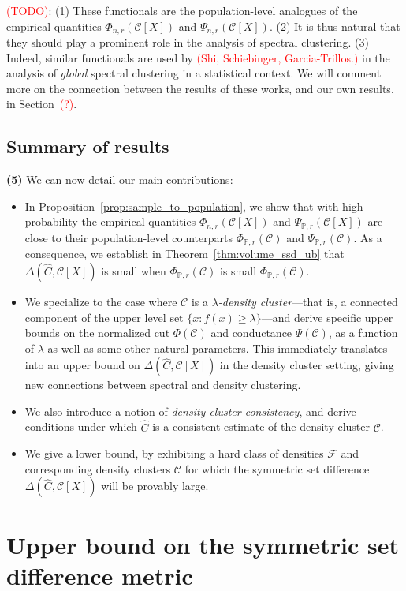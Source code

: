 \documentclass{article}
\newcommand{\1}{\mathbf{1}}
\newcommand{\mc}[1]{\mathcal{#1}}
\newcommand{\Pbb}{\mathbb{P}}
\newcommand{\wh}[1]{\widehat{#1}}
\theoremstyle{alden}
\theoremstyle{aldenthm}
\theoremstyle{definition}
\theoremstyle{remark}
\begin{document}
\textcolor{red}{(TODO)}: (1) These functionals are the population-level analogues of the empirical quantities $\Phi_{n,r}(\mc{C}[X])$ and $\Psi_{n,r}(\mc{C}[X])$. (2) It is thus natural that they should play a prominent role in the analysis of spectral clustering. (3) Indeed, similar functionals are used by \textcolor{red}{(Shi, Schiebinger, Garcia-Trillos.)} in the analysis of \emph{global} spectral clustering in a statistical context. We will comment more on the connection between the results of these works, and our own results, in Section~\textcolor{red}{(?)}. 


\subsection{Summary of results}
\textbf{(5)} We can now detail our main contributions:

\begin{itemize}
	\item In Proposition~\ref{prop:sample_to_population}, we show that with high probability the empirical quantities $\Phi_{n,r}(\mc{C}[X])$ and $\Psi_{\mathbb{P},r}(\mc{C}[X])$ are close to their population-level counterparts $\Phi_{\Pbb,r}(\mc{C})$ and $\Psi_{\Pbb,r}(\mc{C})$. As a consequence, we establish in Theorem~\ref{thm:volume_ssd_ub} that $\Delta(\wh{C},\mc{C}[X])$ is small when $\Phi_{\Pbb,r}(\mc{C})$ is small $\Phi_{\Pbb,r}(\mc{C})$. 
	\item We specialize to the case where $\mc{C}$ is a \emph{$\lambda$-density cluster}---that is, a connected component of the upper level set $\{x: f(x) \geq \lambda\}$---and derive specific upper bounds on the normalized cut $\Phi(\mc{C})$ and conductance $\Psi(\mc{C})$, as a function of $\lambda$ as well as some other natural parameters. This immediately translates into an upper bound on $\Delta(\wh{C},\mc{C}[X])$ in the density cluster setting, giving new connections between spectral and density clustering.
	\item We also introduce a notion of \emph{density cluster consistency}, and derive conditions under which $\wh{C}$ is a consistent estimate of the density cluster $\mc{C}$.
	\item We give a lower bound, by exhibiting a hard class of densities $\mc{F}$ and corresponding density clusters $\mc{C}$ for which the symmetric set difference $\Delta(\wh{C},\mc{C}[X])$ will be provably large.
\end{itemize}

\section{Upper bound on the symmetric set difference metric}
\label{sec:ub_symmetric_set_difference}
\end{document}
